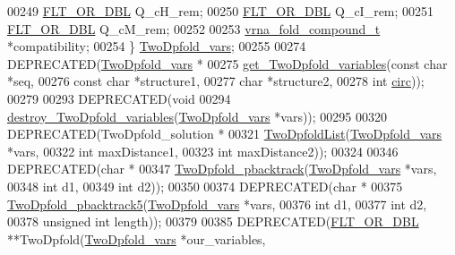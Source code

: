 \begin{DoxyCode}
00249   \hyperlink{group__data__structures_ga31125aeace516926bf7f251f759b6126}{FLT\_OR\_DBL}            Q\_cH\_rem;
00250   \hyperlink{group__data__structures_ga31125aeace516926bf7f251f759b6126}{FLT\_OR\_DBL}            Q\_cI\_rem;
00251   \hyperlink{group__data__structures_ga31125aeace516926bf7f251f759b6126}{FLT\_OR\_DBL}            Q\_cM\_rem;
00252 
00253   \hyperlink{group__fold__compound_structvrna__fc__s}{vrna\_fold\_compound\_t}  *compatibility;
00254 \} \hyperlink{structTwoDpfold__vars}{TwoDpfold\_vars};
00255 
00274 DEPRECATED(\hyperlink{structTwoDpfold__vars}{TwoDpfold\_vars} *
00275            \hyperlink{2Dpfold_8h_a1aca740e2a75ab2b2951538266e53d64}{get\_TwoDpfold\_variables}(\textcolor{keyword}{const} \textcolor{keywordtype}{char} *seq,
00276                                    \textcolor{keyword}{const} \textcolor{keywordtype}{char} *structure1,
00277                                    \textcolor{keywordtype}{char}       *structure2,
00278                                    \textcolor{keywordtype}{int}        \hyperlink{group__model__details_gaf9202a1a09f5828dc731e2d9a10fa111}{circ}));
00279 
00293 DEPRECATED(\textcolor{keywordtype}{void}
00294            \hyperlink{2Dpfold_8h_afe994291458ee2ac34d3eb825ef62a15}{destroy\_TwoDpfold\_variables}(\hyperlink{structTwoDpfold__vars}{TwoDpfold\_vars} *vars));
00295 
00320 DEPRECATED(TwoDpfold\_solution *
00321            \hyperlink{2Dpfold_8h_a692243dac482a1e158a8e1b7881cfda2}{TwoDpfoldList}(\hyperlink{structTwoDpfold__vars}{TwoDpfold\_vars} *vars,
00322                          \textcolor{keywordtype}{int}            maxDistance1,
00323                          \textcolor{keywordtype}{int}            maxDistance2));
00324 
00346 DEPRECATED(\textcolor{keywordtype}{char} *
00347            \hyperlink{2Dpfold_8h_ae251288f50dd4ae7d315af0085775f71}{TwoDpfold\_pbacktrack}(\hyperlink{structTwoDpfold__vars}{TwoDpfold\_vars}  *vars,
00348                                 \textcolor{keywordtype}{int}             d1,
00349                                 \textcolor{keywordtype}{int}             d2));
00350 
00374 DEPRECATED(\textcolor{keywordtype}{char} *
00375            \hyperlink{2Dpfold_8h_a13430ac6a7f90df426774f131647d2c7}{TwoDpfold\_pbacktrack5}(\hyperlink{structTwoDpfold__vars}{TwoDpfold\_vars} *vars,
00376                                  \textcolor{keywordtype}{int}            d1,
00377                                  \textcolor{keywordtype}{int}            d2,
00378                                  \textcolor{keywordtype}{unsigned} \textcolor{keywordtype}{int}   length));
00379 
00385 DEPRECATED(\hyperlink{group__data__structures_ga31125aeace516926bf7f251f759b6126}{FLT\_OR\_DBL} **TwoDpfold(\hyperlink{structTwoDpfold__vars}{TwoDpfold\_vars}  *our\_variables,

\end{DoxyCode}

